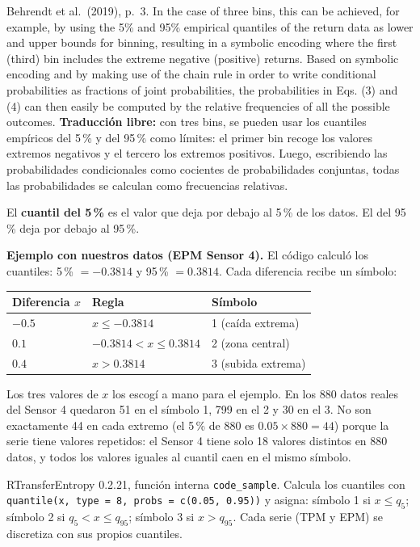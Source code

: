 \documentclass[11pt,openany]{book}
\begin{document}
\begin{cita}{Behrendt et al.\ (2019), p.~3.}
In the case of three bins, this can be achieved, for example, by using the 5\% and 95\% empirical quantiles of the return data as lower and upper bounds for binning, resulting in a symbolic encoding where the first (third) bin includes the extreme negative (positive) returns. Based on symbolic encoding and by making use of the chain rule in order to write conditional probabilities as fractions of joint probabilities, the probabilities in Eqs. (3) and (4) can then easily be computed by the relative frequencies of all the possible outcomes.
\tcblower
\textbf{Traducción libre:} con tres bins, se pueden usar los cuantiles empíricos del 5\,\% y del 95\,\% como límites: el primer bin recoge los valores extremos negativos y el tercero los extremos positivos. Luego, escribiendo las probabilidades condicionales como cocientes de probabilidades conjuntas, todas las probabilidades se calculan como frecuencias relativas.
\end{cita}

\begin{nota}
El \textbf{cuantil del 5\,\%} es el valor que deja por debajo al 5\,\% de los datos. El del 95\,\% deja por debajo al 95\,\%.
\end{nota}

\textbf{Ejemplo con nuestros datos (EPM Sensor 4).} El código calculó los cuantiles: 5\,\% $=-0.3814$ y 95\,\% $=0.3814$. Cada diferencia recibe un símbolo:
\begin{center}
\begin{tabular}{lll}
\toprule
Diferencia $x$ & Regla & Símbolo \\
\midrule
$-0.5$ & $x \le -0.3814$ & 1 (caída extrema) \\
$0.1$ & $-0.3814 < x \le 0.3814$ & 2 (zona central) \\
$0.4$ & $x > 0.3814$ & 3 (subida extrema) \\
\bottomrule
\end{tabular}
\end{center}
Los tres valores de $x$ los escogí a mano para el ejemplo. En los 880 datos reales del Sensor 4 quedaron 51 en el símbolo 1, 799 en el 2 y 30 en el 3. No son exactamente 44 en cada extremo (el 5\,\% de 880 es $0.05 \times 880 = 44$) porque la serie tiene valores repetidos: el Sensor 4 tiene solo 18 valores distintos en 880 datos, y todos los valores iguales al cuantil caen en el mismo símbolo.

\begin{codigo}{RTransferEntropy 0.2.21, función interna \texttt{code\_sample}.}
Calcula los cuantiles con \texttt{quantile(x, type = 8, probs = c(0.05, 0.95))} y asigna: símbolo 1 si $x \le q_{5}$; símbolo 2 si $q_5 < x \le q_{95}$; símbolo 3 si $x > q_{95}$. Cada serie (TPM y EPM) se discretiza con sus propios cuantiles.
\end{codigo}
\end{document}
